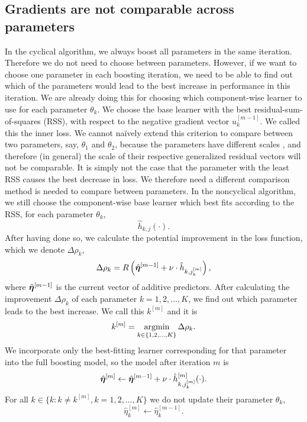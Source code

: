 \subsection{Gradients are not comparable across parameters}
In the cyclical algorithm, we always boost all parameters in the same iteration.
Therefore we do not need to choose between parameters.
However, if we want to choose one parameter in each boosting iteration, we need to be able to find out which of the parameters would lead to the best increase in performance in this iteration.
We are already doing this for choosing which component-wise learner to use for each parameter $\theta_k$.
We choose the base learner with the best residual-sum-of-squares (RSS), with respect to the negative gradient vector $u_k^{[m-1]}$.
We called this the inner loss.
We cannot naïvely extend this criterion to compare between two parameters, say, $\theta_1$ and $\theta_2$, because the parameters have different scales \citep{thomas2018}, and therefore (in general) the scale of their respective generalized residual vectors will not be comparable.
It is simply not the case that the parameter with the least RSS causes the best decrease in loss.
We therefore need a different comparison method is needed to compare between parameters.
In the noncyclical algorithm, we still choose the component-wise base learner which best fits according to the RSS, for each parameter $\theta_k$,
\begin{equation*}
    \hat{h}_{k,j}(\cdot).
\end{equation*}
After having done so, we calculate the potential improvement in the loss function, which we denote $\Delta\rho_{k}$,
\begin{equation*}
    \Delta\rho_{k}=R\left(\hat{\boldsymbol{\eta}}^{[m-1]}+\nu\cdot\hat{h}_{k,j_{k}^{[m]}}\right),
\end{equation*}
where $\hat{\boldsymbol{\eta}}^{[m-1]}$ is the current vector of additive predictors.
After calculating the improvement $\Delta\rho_{k}$ of each parameter $k=1,2,\ldots,K$, we find out which parameter leads to the best increase.
We call this $k^{[m]}$ and it is
\begin{equation*}
    k^{[m]}=\operatorname*{argmin}_{k\in\{1,2,\ldots,K\}}\Delta\rho_{k}.
\end{equation*}
We incorporate only the best-fitting learner corresponding for that parameter into the full boosting model, so the model after iteration $m$ is
\begin{equation*}
    \hat{\boldsymbol{\eta}}^{[m]}\gets \hat{\boldsymbol{\eta}}^{[m-1]}+\nu\cdot\hat{h}^{[m]}_{k,j_k^{[m]}}(\cdot).
\end{equation*}
For all $k\in\{k\colon k\neq k^{[m]}, k=1,2,\ldots,K\}$ we do not update their parameter $\theta_k$,
\begin{equation*}
    \hat{\eta}_{k}^{[m]}\gets\hat{\eta}_{k}^{[m-1]}.
\end{equation*}

